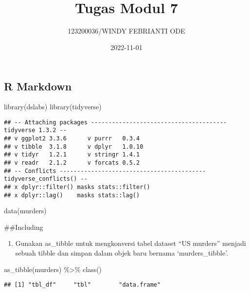 \documentclass[
]{article}
\title{Tugas Modul 7}
\author{123200036/WINDY FEBRIANTI ODE}
\date{2022-11-01}
\newenvironment{Shaded}{\begin{snugshade}}{\end{snugshade}}
\newcommand{\FunctionTok}[1]{\textcolor[rgb]{0.00,0.00,0.00}{#1}}
\newcommand{\NormalTok}[1]{#1}
\newcommand{\SpecialCharTok}[1]{\textcolor[rgb]{0.00,0.00,0.00}{#1}}
\providecommand{\tightlist}{%
  \setlength{\itemsep}{0pt}\setlength{\parskip}{0pt}}
\begin{document}
\maketitle

\hypertarget{r-markdown}{%
\subsection{R Markdown}\label{r-markdown}}

\begin{Shaded}
\begin{Highlighting}[]
\FunctionTok{library}\NormalTok{(dslabs)}
\FunctionTok{library}\NormalTok{(tidyverse)}
\end{Highlighting}
\end{Shaded}

\begin{verbatim}
## -- Attaching packages --------------------------------------- tidyverse 1.3.2 --
## v ggplot2 3.3.6      v purrr   0.3.4 
## v tibble  3.1.8      v dplyr   1.0.10
## v tidyr   1.2.1      v stringr 1.4.1 
## v readr   2.1.2      v forcats 0.5.2 
## -- Conflicts ------------------------------------------ tidyverse_conflicts() --
## x dplyr::filter() masks stats::filter()
## x dplyr::lag()    masks stats::lag()
\end{verbatim}

\begin{Shaded}
\begin{Highlighting}[]
\FunctionTok{data}\NormalTok{(murders)}
\end{Highlighting}
\end{Shaded}

\#\#Including

\begin{enumerate}
\def\labelenumi{\arabic{enumi}.}
\tightlist
\item
  Gunakan as\_tibble untuk mengkonversi tabel dataset ``US murders''
  menjadi sebuah tibble dan simpan dalam objek baru bernama
  `murders\_tibble'.
\end{enumerate}

\begin{Shaded}
\begin{Highlighting}[]
\FunctionTok{as\_tibble}\NormalTok{(murders) }\SpecialCharTok{\%\textgreater{}\%} \FunctionTok{class}\NormalTok{()}
\end{Highlighting}
\end{Shaded}

\begin{verbatim}
## [1] "tbl_df"     "tbl"        "data.frame"
\end{verbatim}
\end{document}
